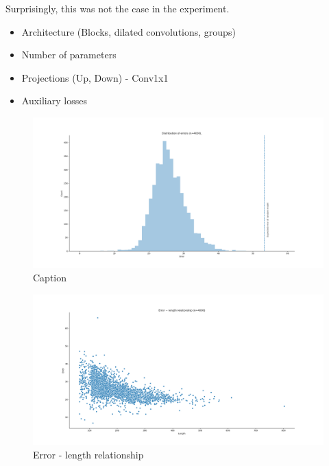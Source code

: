     
Surprisingly, this was not the case in the experiment.
    
\begin{itemize}
    \item Architecture (Blocks, dilated convolutions, groups)
    \item Number of parameters
    \item Projections (Up, Down) - Conv1x1
    \item Auxiliary losses
\end{itemize}

\begin{figure}
    \centering
    \includegraphics[width=\linewidth]{imgs_andy/error_distribution_200430m93s4000.png}
    \caption{Caption}
    \label{fig:error_dist}
\end{figure}

\begin{figure}
    \centering
    \includegraphics[width=\linewidth]{imgs_andy/error_length_200430m93s4000.png}
    \caption{Error - length relationship}
    \label{fig:err_len}
\end{figure}

